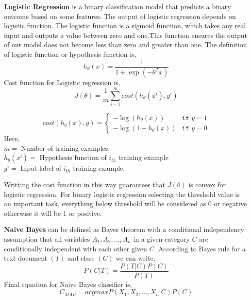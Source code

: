 \textbf{Logistic Regression} \cite{sharma2015active} is a binary classification model that predicts a binary outcome based on some features. The output of logistic regression depends on logistic function. The logistic function is a sigmoid function, which takes any real input and outputs a value between zero and one.This function ensures the output of our model does not become less than zero and greater than one. The definition of logistic function or hypothesis function is,
\begin{equation}
    h_{\theta}(x) =  \frac{1}{1+\exp({-\theta^T x})}
\end{equation}
Cost function for Logistic regression is,
\begin{equation}
    J(\theta) = \frac{1}{m}\sum_{i-1}^{m}cost(h_{\theta}(x^{i}),y^{i})   
\end{equation}

\[
cost(h_{\theta}(x), y) = 
\begin{cases}
    -\log (h_{\theta}(x)) & \texttt{if } y = 1\\
     -\log (1-h_{\theta}(x)) & \texttt{if } y = 0
\end{cases}
\]
Here,\\
$m = $ Number of training examples.\\
$h_{\theta}(x^{i}) = $ Hypothesis function of $i_{th}$ training example\\
$y^i = $ Input label of $i_{th}$ training example.
\vspace{0.2cm}

\noindent
Writting the cost function in this way guarantees that $J(\theta)$ is convex for logistic regression.
For binary logistic regression selecting
the threshold value is an important task, everything below threshold will be considered as 0 or negative otherwise it will be 1 or positive.


\vspace{0.3cm}
\textbf{Naive Bayes} \cite{yoo2015classification} can be defined as Bayes theorem with a conditional independency assumption that all variables $A_{1},A_{2},...,A_{n}$ in a given category $C$ are conditionally independent with each other given $C$. 
According to Bayes rule for a text document $(T)$ and class $(C)$ we can write,
\begin{equation}
    P(C|T) = \frac{P(T|C)P(C)}{P(T)}
\end{equation}
Final equation for Naive Bayes classifier is,
\begin{equation}
     C_{MAP} = argmax P(X_{1},X_{2},...,X_{n}|C)P(C)
\end{equation}

